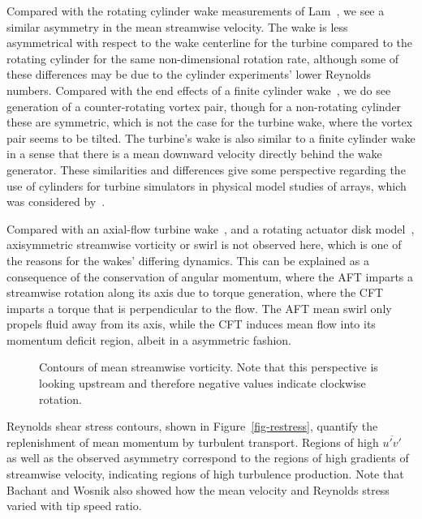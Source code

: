 Compared with the rotating cylinder wake measurements of Lam~\cite{Lam2009}, we
see a similar asymmetry in the mean streamwise velocity. The wake is less
asymmetrical with respect to the wake centerline for the turbine compared to the
rotating cylinder for the same non-dimensional rotation rate, although some of
these differences may be due to the cylinder experiments' lower Reynolds
numbers. Compared with the end effects of a finite cylinder
wake~\cite{Sumner2004}, we do see generation of a counter-rotating vortex pair,
though for a non-rotating cylinder these are symmetric, which is not the case
for the turbine wake, where the vortex pair seems to be tilted. The turbine's
wake is also similar to a finite cylinder wake in a sense that there is a mean
downward velocity directly behind the wake generator. These similarities and
differences give some perspective regarding the use of cylinders for turbine
simulators in physical model studies of arrays, which was considered
by~\cite{Pierce2013}.

Compared with an axial-flow turbine wake~\cite{Cal2010}, and a rotating actuator
disk model~\cite{Wu2011}, axisymmetric streamwise vorticity or swirl is not
observed here, which is one of the reasons for the wakes' differing dynamics.
This can be explained as a consequence of the conservation of angular momentum,
where the AFT imparts a streamwise rotation along its axis due to torque
generation, where the CFT imparts a torque that is perpendicular to the flow.
The AFT mean swirl only propels fluid away from its axis, while the CFT induces
mean flow into its momentum deficit region, albeit in a asymmetric fashion.

\begin{figure}
    \centering
    

    \caption{Contours of mean streamwise vorticity. Note that this perspective
        is looking upstream and therefore negative values indicate clockwise
        rotation.}
    
    \label{fig-xvorticity}
\end{figure}

Reynolds shear stress contours, shown in Figure~\ref{fig-restress}, quantify the
replenishment of mean momentum by turbulent transport. Regions of high
$\overline{u'v'}$ as well as the observed asymmetry correspond to the regions of
high gradients of streamwise velocity, indicating regions of high turbulence
production. Note that Bachant and Wosnik \cite{Bachant2013} also showed how the
mean velocity and Reynolds stress varied with tip speed ratio.

